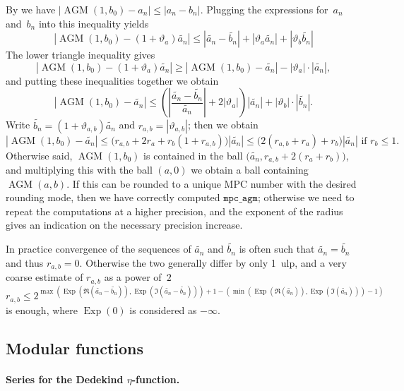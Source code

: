 \documentclass [11pt]{article}
\newcommand {\appro}[1]{\widetilde {#1}}
\newcommand {\ulp}[1]{#1~ulp}
\DeclareMathOperator{\Exp}{\operatorname {Exp}}
\renewcommand {\theta}{\vartheta}
\renewcommand {\leq}{\leqslant}
\renewcommand {\geq}{\geqslant}
\newcommand {\AGM}{\operatorname{AGM}}
\begin{document}
By \cite [p.87]{Dupont06} we have $|\AGM (1, b_0) - a_n| \leq |a_n - b_n|$.
Plugging the expressions for~$a_n$ and~$b_n$ into this inequality yields
\[
|\AGM (1, b_0) - (1 + \theta_a) \appro {a_n}|
\leq |\appro {a_n} - \appro {b_n}| + |\theta_a \appro {a_n}|
   + |\theta_b \appro {b_n}|
\]
The lower triangle inequality gives
\[
|\AGM (1, b_0) - (1 + \theta_a) \appro {a_n}|
\geq |\AGM (1, b_0) - \appro {a_n}| - |\theta_a| \cdot |\appro {a_n}|,
\]
and putting these inequalities together we obtain
\[
|\AGM (1, b_0) - \appro {a_n}|
\leq
\left( \left| \frac {\appro {a_n} - \appro {b_n}}{\appro {a_n}} \right|
   + 2 |\theta_a| \right) |\appro {a_n}|
   + |\theta_b| \cdot |\appro {b_n}|.
\]
Write $\appro {b_n} = (1 + \theta_{a,b}) \appro {a_n}$
and $r_{a, b} = |\theta_{a,b}|$; then we obtain
\[
|\AGM (1, b_0) - \appro {a_n}|
\leq
\big( r_{a, b} + 2 r_a + r_b (1 + r_{a, b}) \big) |\appro {a_n}|
\leq
\big( 2 (r_{a, b} + r_a) + r_b \big) |\appro {a_n}|
\text { if } r_b \leq 1.
\]
Otherwise said, $\AGM (1, b_0)$ is contained in the ball
$\big( \appro {a_n}, r_{a, b} + 2 (r_a + r_b) \big)$, and multiplying
this with the ball $(a, 0)$ we obtain a ball containing $\AGM (a, b)$.
If this can be rounded to a unique MPC number with the desired rounding
mode, then we have correctly computed $\texttt {mpc\_agm}$; otherwise we
need to repeat the computations at a higher precision, and the exponent
of the radius gives an indication on the necessary precision increase.

In practice convergence of the sequences of $\appro {a_n}$ and
$\appro {b_n}$ is often such that $\appro {a_n} = \appro {b_n}$ and thus
$r_{a, b} = 0$.
Otherwise the two generally differ by only \ulp {1}, and a very coarse
estimate of $r_{a,b}$ as a power of~$2$
\[
r_{a, b} \leq
2^{\max \left( \Exp (\Re (\appro {a_n} - \appro {b_n})),
               \Exp (\Im (\appro {a_n} - \appro {b_n})) \right) + 1
   - \left( \min \left( \Exp (\Re (\appro {a_n})), \Exp (\Im (\appro {a_n}))
                 \right)
            - 1 \right)}
\]
is enough, where $\Exp (0)$ is considered as $- \infty$.

\subsection {Modular functions}

\paragraph {Series for the Dedekind $\eta$-function.}
\end{document}
